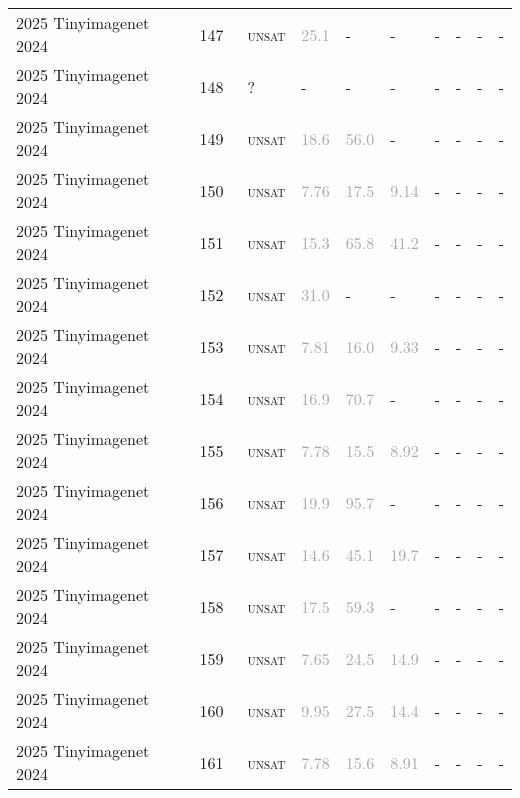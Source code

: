 \begin{center}
{\begin{longtable}{@{}llllllllll@{}}
2025 Tinyimagenet 2024 & 147 & ~\textsc{unsat} & \textcolor{darkgray}{25.1} & - & - & - & - & - & - \\
2025 Tinyimagenet 2024 & 148 & ~? & - & - & - & - & - & - & - \\
2025 Tinyimagenet 2024 & 149 & ~\textsc{unsat} & \textcolor{darkgray}{18.6} & \textcolor{darkgray}{56.0} & - & - & - & - & - \\
2025 Tinyimagenet 2024 & 150 & ~\textsc{unsat} & \textcolor{darkgray}{7.76} & \textcolor{darkgray}{17.5} & \textcolor{darkgray}{9.14} & - & - & - & - \\
2025 Tinyimagenet 2024 & 151 & ~\textsc{unsat} & \textcolor{darkgray}{15.3} & \textcolor{darkgray}{65.8} & \textcolor{darkgray}{41.2} & - & - & - & - \\
2025 Tinyimagenet 2024 & 152 & ~\textsc{unsat} & \textcolor{darkgray}{31.0} & - & - & - & - & - & - \\
2025 Tinyimagenet 2024 & 153 & ~\textsc{unsat} & \textcolor{darkgray}{7.81} & \textcolor{darkgray}{16.0} & \textcolor{darkgray}{9.33} & - & - & - & - \\
2025 Tinyimagenet 2024 & 154 & ~\textsc{unsat} & \textcolor{darkgray}{16.9} & \textcolor{darkgray}{70.7} & - & - & - & - & - \\
2025 Tinyimagenet 2024 & 155 & ~\textsc{unsat} & \textcolor{darkgray}{7.78} & \textcolor{darkgray}{15.5} & \textcolor{darkgray}{8.92} & - & - & - & - \\
2025 Tinyimagenet 2024 & 156 & ~\textsc{unsat} & \textcolor{darkgray}{19.9} & \textcolor{darkgray}{95.7} & - & - & - & - & - \\
2025 Tinyimagenet 2024 & 157 & ~\textsc{unsat} & \textcolor{darkgray}{14.6} & \textcolor{darkgray}{45.1} & \textcolor{darkgray}{19.7} & - & - & - & - \\
2025 Tinyimagenet 2024 & 158 & ~\textsc{unsat} & \textcolor{darkgray}{17.5} & \textcolor{darkgray}{59.3} & - & - & - & - & - \\
2025 Tinyimagenet 2024 & 159 & ~\textsc{unsat} & \textcolor{darkgray}{7.65} & \textcolor{darkgray}{24.5} & \textcolor{darkgray}{14.9} & - & - & - & - \\
2025 Tinyimagenet 2024 & 160 & ~\textsc{unsat} & \textcolor{darkgray}{9.95} & \textcolor{darkgray}{27.5} & \textcolor{darkgray}{14.4} & - & - & - & - \\
2025 Tinyimagenet 2024 & 161 & ~\textsc{unsat} & \textcolor{darkgray}{7.78} & \textcolor{darkgray}{15.6} & \textcolor{darkgray}{8.91} & - & - & - & - \\

\end{longtable}}
\end{center}
